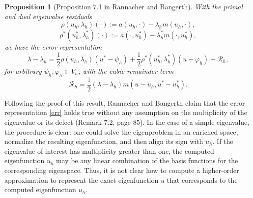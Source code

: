 \documentclass[12pt,a4paper]{article}
\theoremstyle{boldthm}
\newtheorem{proposition}[theorem]{Proposition}
\theoremstyle{bolddefn}
\begin{document}
\begin{proposition}[Proposition 7.1 in Rannacher and Bangerth]
With the primal and dual eigenvalue residuals
\begin{equation}
\rho(u_h,\lambda_h)(\cdot)
:= a(u_h,\cdot) - \lambda_h m(u_h,\cdot),
\end{equation} 
\begin{equation}
\rho^*(u_h^*,\lambda_h^*)(\cdot)
:= a(\cdot,u_h^*) - \overline{\lambda_h^*} m(\cdot,u_h^*),
\end{equation}
we have the error representation
\begin{equation}\label{err}
\lambda - \lambda_h
=
\frac{1}{2}\rho(u_h,\lambda_h)(u^*-\psi_h)
+
\frac{1}{2}\rho^*(u_h^*,\lambda_h^*)(u-\varphi_h)
+
\mathcal{R}_h,
\end{equation}
for arbitrary $\psi_h,\varphi_h\in V_h$, with the cubic remainder term
\begin{equation}
\mathcal{R}_h
=
\frac{1}{2}(\lambda-\lambda_h)
m(u-u_h,u^*-u_h^*).
\end{equation}
\end{proposition}
Following the proof of this result, Rannacher and Bangerth claim that the error representation \eqref{err} holds true without any assumption on the
multiplicity of the eigenvalue or its defect (Remark 7.2, page 85). In the case of a simple eigenvalue, the procedure is clear: one could solve the eigenproblem in an enriched space, normalize the resulting eigenfunction, and then align its sign with $u_h.$ If the eigenvalue of interest has multiplicity greater than one, the computed eigenfunction $u_h$ may be any linear combination of the basis functions for the corresponding eigenspace. Thus, it is not clear how to compute a higher-order approximation to represent the exact eigenfunction $u$ that corresponds to the computed eigenfunction $u_h.$ 







\end{document}
